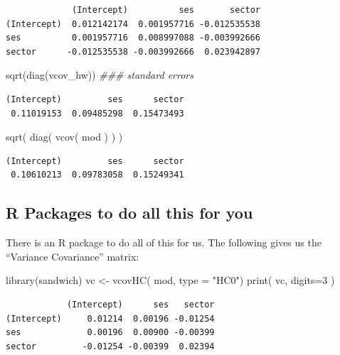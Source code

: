 \documentclass[
  letterpaper,
  DIV=11,
  numbers=noendperiod]{scrreprt}
\newenvironment{Shaded}{\begin{snugshade}}{\end{snugshade}}
\newcommand{\AttributeTok}[1]{\textcolor[rgb]{0.49,0.56,0.16}{#1}}
\newcommand{\DecValTok}[1]{\textcolor[rgb]{0.25,0.63,0.44}{#1}}
\newcommand{\DocumentationTok}[1]{\textcolor[rgb]{0.73,0.13,0.13}{\textit{#1}}}
\newcommand{\FunctionTok}[1]{\textcolor[rgb]{0.02,0.16,0.49}{#1}}
\newcommand{\NormalTok}[1]{\textcolor[rgb]{0.00,0.44,0.13}{#1}}
\newcommand{\OtherTok}[1]{\textcolor[rgb]{0.00,0.44,0.13}{#1}}
\newcommand{\StringTok}[1]{\textcolor[rgb]{0.25,0.44,0.63}{#1}}
\begin{document}
\begin{verbatim}
             (Intercept)          ses       sector
(Intercept)  0.012142174  0.001957716 -0.012535538
ses          0.001957716  0.008997088 -0.003992666
sector      -0.012535538 -0.003992666  0.023942897
\end{verbatim}

\begin{Shaded}
\begin{Highlighting}[]
\FunctionTok{sqrt}\NormalTok{(}\FunctionTok{diag}\NormalTok{(vcov\_hw)) }\DocumentationTok{\#\#\# standard errors}
\end{Highlighting}
\end{Shaded}

\begin{verbatim}
(Intercept)         ses      sector 
 0.11019153  0.09485298  0.15473493 
\end{verbatim}

\begin{Shaded}
\begin{Highlighting}[]
\FunctionTok{sqrt}\NormalTok{( }\FunctionTok{diag}\NormalTok{( }\FunctionTok{vcov}\NormalTok{( mod ) ) )}
\end{Highlighting}
\end{Shaded}

\begin{verbatim}
(Intercept)         ses      sector 
 0.10610213  0.09783058  0.15249341 
\end{verbatim}

\hypertarget{r-packages-to-do-all-this-for-you}{%
\subsection{R Packages to do all this for
you}\label{r-packages-to-do-all-this-for-you}}

There is an R package to do all of this for us. The following gives us
the ``Variance Covariance'' matrix:

\begin{Shaded}
\begin{Highlighting}[]
\FunctionTok{library}\NormalTok{(sandwich)}
\NormalTok{vc }\OtherTok{\textless{}{-}} \FunctionTok{vcovHC}\NormalTok{( mod, }\AttributeTok{type =} \StringTok{"HC0"}\NormalTok{)}
\FunctionTok{print}\NormalTok{( vc, }\AttributeTok{digits=}\DecValTok{3}\NormalTok{ )}
\end{Highlighting}
\end{Shaded}

\begin{verbatim}
            (Intercept)      ses   sector
(Intercept)     0.01214  0.00196 -0.01254
ses             0.00196  0.00900 -0.00399
sector         -0.01254 -0.00399  0.02394
\end{verbatim}
\end{document}
